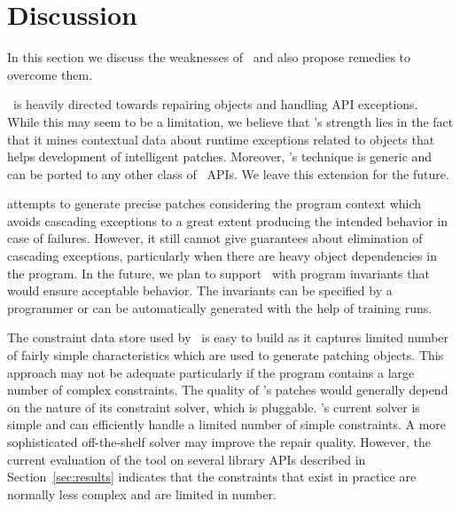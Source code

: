 \section{Discussion}
\label{sec:discussion}

In this section we discuss the weaknesses of \tool\ and also propose
remedies to overcome them.

 \tool\ is heavily directed towards repairing 
  objects and handling API
exceptions. While this may seem to be a limitation, we believe that \tool's
strength lies in the fact that it mines contextual data about runtime exceptions
related to  objects that helps development of intelligent patches.
Moreover, \tool's technique is generic and can be ported to any other class of
\java\ APIs. We leave this extension for the future.

 \tool attempts to
generate precise patches considering the program context which avoids
cascading exceptions to a great extent producing the intended behavior in case
of failures. However, it still cannot give guarantees about elimination of cascading
exceptions, particularly when there are heavy object dependencies in the program.
In the future, we plan to support \tool\ with program invariants that would ensure 
acceptable behavior. The invariants can be specified by a programmer or can be
automatically generated with the help of training runs.

 The constraint data store used by
\tool\ is easy to build as it captures
limited number of fairly simple  characteristics which are used to
generate patching  objects. This approach may not be adequate particularly
if the program contains a large number of complex constraints. The quality of
\tool's patches would generally depend on the nature of its constraint solver,
which is pluggable. \tool's current solver is simple and can efficiently
handle a limited number of simple constraints. A more sophisticated off-the-shelf solver may improve
the repair quality. However, the current evaluation of the tool
on several library APIs described in Section~\ref{sec:results} indicates that the constraints that exist
in practice are normally less complex and are limited in number.